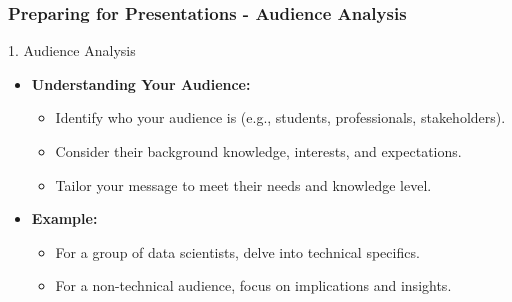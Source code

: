 \documentclass[aspectratio=169]{beamer}
\begin{document}
\begin{frame}[fragile]
    \frametitle{Preparing for Presentations - Audience Analysis}
    \begin{block}{1. Audience Analysis}
        \begin{itemize}
            \item \textbf{Understanding Your Audience:}
                \begin{itemize}
                    \item Identify who your audience is (e.g., students, professionals, stakeholders).
                    \item Consider their background knowledge, interests, and expectations.
                    \item Tailor your message to meet their needs and knowledge level.
                \end{itemize}
            \item \textbf{Example:} 
                \begin{itemize}
                    \item For a group of data scientists, delve into technical specifics.
                    \item For a non-technical audience, focus on implications and insights.
                \end{itemize}
        \end{itemize}
    \end{block}
\end{frame}
\end{document}
